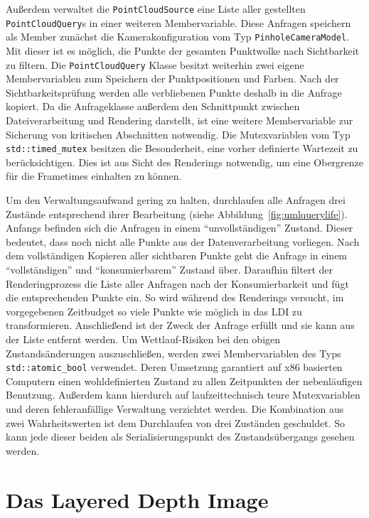 \documentclass[hyperref, beleg, german, final, twoside]{cgvpub}
\begin{document}
Außerdem verwaltet die \texttt{PointCloudSource} eine Liste aller gestellten
\texttt{PointCloudQuery}s in einer weiteren Membervariable. Diese Anfragen
speichern als Member zunächst die Kamerakonfiguration vom Typ
\texttt{PinholeCameraModel}. Mit dieser ist es möglich, die Punkte der gesamten
Punktwolke nach Sichtbarkeit zu filtern. Die \texttt{PointCloudQuery} Klasse
besitzt weiterhin zwei eigene Membervariablen zum Speichern der Punktpositionen
und Farben. Nach der Sichtbarkeitsprüfung werden alle verbliebenen Punkte
deshalb in die Anfrage kopiert. Da die Anfrageklasse außerdem den Schnittpunkt
zwischen Dateiverarbeitung und Rendering darstellt, ist eine weitere
Membervariable zur Sicherung von kritischen Abschnitten notwendig. Die
Mutexvariablen vom Typ \texttt{std::timed\_mutex} besitzen die Besonderheit,
eine vorher definierte Wartezeit zu berücksichtigen. Dies ist aus Sicht des
Renderings notwendig, um eine Obergrenze für die Frametimes einhalten zu
können.

Um den Verwaltungsaufwand gering zu halten, durchlaufen alle Anfragen drei
Zustände entsprechend ihrer Bearbeitung (siehe
Abbildung~\ref{fig:umlquerylife}). Anfangs befinden sich die Anfragen in einem
``unvollständigen'' Zustand. Dieser bedeutet, dass noch nicht alle Punkte aus
der Datenverarbeitung vorliegen. Nach dem vollständigen Kopieren aller
sichtbaren Punkte geht die Anfrage in einem ``vollständigen'' und
``konsumierbarem'' Zustand über. Daraufhin filtert der Renderingprozess die
Liste aller Anfragen nach der Konsumierbarkeit und fügt die entsprechenden
Punkte ein. So wird während des Renderings versucht, im vorgegebenen Zeitbudget
so viele Punkte wie möglich in das LDI zu transformieren. Anschließend ist der
Zweck der Anfrage erfüllt und sie kann aus der Liste entfernt werden. Um
Wettlauf-Risiken bei den obigen Zustandsänderungen auszuschließen, werden zwei
Membervariablen des Typs \texttt{std::atomic\_bool} verwendet. Deren Umsetzung
garantiert auf x86 basierten Computern einen wohldefinierten Zustand zu allen
Zeitpunkten der nebenläufigen Benutzung. Außerdem kann hierdurch auf
laufzeittechnisch teure Mutexvariablen und deren fehleranfällige Verwaltung
verzichtet werden. Die Kombination aus zwei Wahrheitswerten ist dem Durchlaufen
von drei Zuständen geschuldet. So kann jede dieser beiden als
Serialisierungspunkt des Zustandsübergangs gesehen werden.

\section{Das Layered Depth Image}
\end{document}
